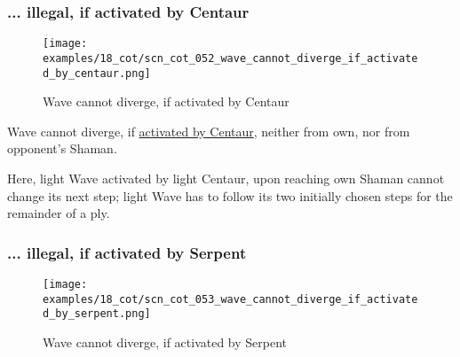 \clearpage %

\subsubsection*{... illegal, if activated by Centaur}
\label{sec:Conquest of Tlalocan/Divergence/... illegal, if activated by Centaur}

\vspace*{-1.4\baselineskip}
\noindent
\begin{figure}[!h]
\texttt{[image: examples/18\_cot/scn\_cot\_052\_wave\_cannot\_diverge\_if\_activated\_by\_centaur.png]}
\vspace*{-1.3\baselineskip}
\caption{Wave cannot diverge, if activated by Centaur}
\label{fig:scn_cot_052_wave_cannot_diverge_if_activated_by_centaur}
\end{figure}

\vspace*{-0.5\baselineskip}
Wave cannot diverge, if
\hyperref[fig:scn_hd_07_wave_activation_by_centaur_first_step]{activated by Centaur},
neither from own, nor from opponent's Shaman.

Here, light Wave activated by light Centaur, upon reaching own Shaman cannot change
its next step; light Wave has to follow its two initially chosen steps for the
remainder of a ply.

\clearpage %

\subsubsection*{... illegal, if activated by Serpent}
\label{sec:Conquest of Tlalocan/Divergence/... illegal, if activated by Serpent}

\vspace*{-1.4\baselineskip}
\noindent
\begin{figure}[!h]
\texttt{[image: examples/18\_cot/scn\_cot\_053\_wave\_cannot\_diverge\_if\_activated\_by\_serpent.png]}
\vspace*{-1.3\baselineskip}
\caption{Wave cannot diverge, if activated by Serpent}
\label{fig:scn_cot_053_wave_cannot_diverge_if_activated_by_serpent}
\end{figure}

